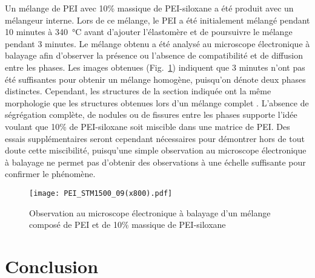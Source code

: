 Un mélange de PEI avec 10\% massique de PEI-siloxane a été produit avec un mélangeur interne. 
Lors de ce mélange, le PEI a été initialement mélangé pendant 10 minutes à \SI[locale=FR]{340}{\celsius} avant d'ajouter l'élastomère et de poursuivre le mélange pendant 3 minutes. 
Le mélange obtenu a été analysé au microscope électronique à balayage afin d'observer la présence ou l'absence de compatibilité et de diffusion entre les phases. 
Les images obtenues (Fig.~\ref{fig:SEM_mix_STM1500_PEI}) indiquent que 3 minutes n'ont pas été suffisantes pour obtenir un mélange homogène, puisqu'on dénote deux phases distinctes. 
Cependant, les structures de la section indiquée ont la même morphologie que les structures obtenues lors d'un mélange complet \cite{Hatui2015}. 
L'absence de ségrégation complète, de nodules ou de fissures entre les phases supporte l'idée voulant que 10\% de PEI-siloxane soit miscible dans une matrice de PEI. 
Des essais supplémentaires seront cependant nécessaires pour démontrer hors de tout doute cette miscibilité, puisqu'une simple observation au microscope électronique à balayage ne permet pas d'obtenir des observations à une échelle suffisante pour confirmer le phénomène. 

\begin{figure}[h]
	\centering
	\texttt{[image: PEI\_STM1500\_09(x800).pdf]}
	\caption{Observation au microscope électronique à balayage d'un mélange composé de PEI et de 10\% massique de PEI-siloxane}
	\label{fig:SEM_mix_STM1500_PEI}
\end{figure}

\FloatBarrier
\section{Conclusion}

